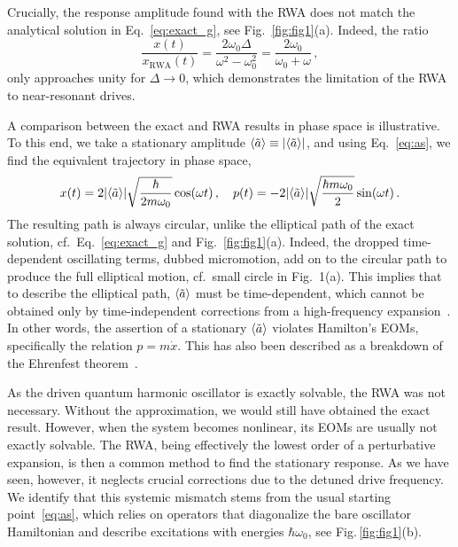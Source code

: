 Crucially, the response amplitude found with the RWA does not match the analytical solution in Eq.~\eqref{eq:exact_g}, see Fig.~\ref{fig:fig1}(a). Indeed, the ratio
\begin{equation}
\frac{x(t)}{x_{\text{RWA}}(t)} = \frac{2\omega_0\Delta}{\omega^2-\omega_0^2}= \frac{2\omega_0}{\omega_0+\omega}\,,
\end{equation}
only approaches unity for $\Delta \rightarrow 0$, which demonstrates the limitation of the RWA to near-resonant drives. 

A comparison  between the exact and RWA results in phase space is illustrative. To this end, we take a stationary amplitude $\langle\tilde{a}\rangle \equiv \abs{\langle\tilde{a}\rangle} $, and using Eq.~\eqref{eq:as}, we find the equivalent trajectory in phase space,
\begin{equation}
x(t) = 2\abs{\langle\tilde{a}\rangle} \sqrt{\frac{\hbar}{2 m \omega_0}} \cos(\omega t) \,, \quad p(t) = -2\abs{\langle\tilde{a}\rangle}\sqrt{\frac{\hbar m \omega_0}{2}} \sin(\omega t) \,.
\end{equation}
The resulting path is always circular, unlike the elliptical path of the exact solution, cf.~Eq.~\eqref{eq:exact_g} and Fig.~\ref{fig:fig1}(a).
Indeed, the dropped time-dependent oscillating terms, dubbed micromotion, add on to the circular path to produce the full elliptical motion, cf.~small circle in Fig.~1(a). This implies that to describe the elliptical path, $\langle\tilde{a}\rangle$ must be time-dependent, which cannot be obtained only by time-independent corrections from a high-frequency expansion~\cite{Mikami2016, Eckardt2017,Eckardt2015,Bukov2015,Goldman2014}.  
In other words, the assertion of a stationary $\langle\tilde{a}\rangle$ violates Hamilton's EOMs, specifically the relation $p = m \dot{x}$. This has also been described as a breakdown of the Ehrenfest theorem~\cite{Ford_1996}.

As the driven quantum harmonic oscillator is exactly solvable, the RWA was not necessary. Without the approximation, we would still have obtained the exact result. However, when the system becomes nonlinear, its EOMs are usually not exactly solvable. The RWA, being effectively the lowest order of a perturbative expansion, is then a common method to find the stationary response. As we have seen, however, it neglects crucial corrections due to the detuned drive frequency.
We identify that this systemic mismatch stems from the usual starting point~\eqref{eq:as}, which relies on operators that diagonalize the bare oscillator Hamiltonian and describe excitations with energies $\hbar \omega_0$, see Fig.\,\ref{fig:fig1}(b).

